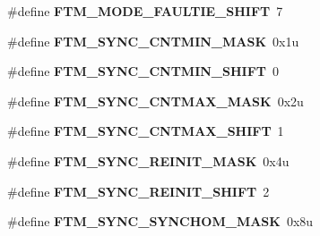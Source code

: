 \begin{DoxyCompactItemize}
\item 
\hypertarget{group___f_t_m___register___masks_gac8de910f0297704ac0625948d59856d6}{}\#define {\bfseries F\+T\+M\+\_\+\+M\+O\+D\+E\+\_\+\+F\+A\+U\+L\+T\+I\+E\+\_\+\+S\+H\+I\+F\+T}~7\label{group___f_t_m___register___masks_gac8de910f0297704ac0625948d59856d6}

\item 
\hypertarget{group___f_t_m___register___masks_gaee5f107bf44191de4f5e747d4764e3ed}{}\#define {\bfseries F\+T\+M\+\_\+\+S\+Y\+N\+C\+\_\+\+C\+N\+T\+M\+I\+N\+\_\+\+M\+A\+S\+K}~0x1u\label{group___f_t_m___register___masks_gaee5f107bf44191de4f5e747d4764e3ed}

\item 
\hypertarget{group___f_t_m___register___masks_gacdc3ce84e897d0dd03b6ff7c483a6e4f}{}\#define {\bfseries F\+T\+M\+\_\+\+S\+Y\+N\+C\+\_\+\+C\+N\+T\+M\+I\+N\+\_\+\+S\+H\+I\+F\+T}~0\label{group___f_t_m___register___masks_gacdc3ce84e897d0dd03b6ff7c483a6e4f}

\item 
\hypertarget{group___f_t_m___register___masks_gae6aedee28d8bdb29e4f4a309e85ccdb0}{}\#define {\bfseries F\+T\+M\+\_\+\+S\+Y\+N\+C\+\_\+\+C\+N\+T\+M\+A\+X\+\_\+\+M\+A\+S\+K}~0x2u\label{group___f_t_m___register___masks_gae6aedee28d8bdb29e4f4a309e85ccdb0}

\item 
\hypertarget{group___f_t_m___register___masks_gad9a59cf6ab219dcb7f646d74e599ddb4}{}\#define {\bfseries F\+T\+M\+\_\+\+S\+Y\+N\+C\+\_\+\+C\+N\+T\+M\+A\+X\+\_\+\+S\+H\+I\+F\+T}~1\label{group___f_t_m___register___masks_gad9a59cf6ab219dcb7f646d74e599ddb4}

\item 
\hypertarget{group___f_t_m___register___masks_gafae9d365874a8b4adc13ccc1a3873b6a}{}\#define {\bfseries F\+T\+M\+\_\+\+S\+Y\+N\+C\+\_\+\+R\+E\+I\+N\+I\+T\+\_\+\+M\+A\+S\+K}~0x4u\label{group___f_t_m___register___masks_gafae9d365874a8b4adc13ccc1a3873b6a}

\item 
\hypertarget{group___f_t_m___register___masks_gaf3a51fedf11a10a6793f9df11ca77e87}{}\#define {\bfseries F\+T\+M\+\_\+\+S\+Y\+N\+C\+\_\+\+R\+E\+I\+N\+I\+T\+\_\+\+S\+H\+I\+F\+T}~2\label{group___f_t_m___register___masks_gaf3a51fedf11a10a6793f9df11ca77e87}

\item 
\hypertarget{group___f_t_m___register___masks_ga1393ccaf9753328f3b3b65cf28f6804f}{}\#define {\bfseries F\+T\+M\+\_\+\+S\+Y\+N\+C\+\_\+\+S\+Y\+N\+C\+H\+O\+M\+\_\+\+M\+A\+S\+K}~0x8u\label{group___f_t_m___register___masks_ga1393ccaf9753328f3b3b65cf28f6804f}


\end{DoxyCompactItemize}
